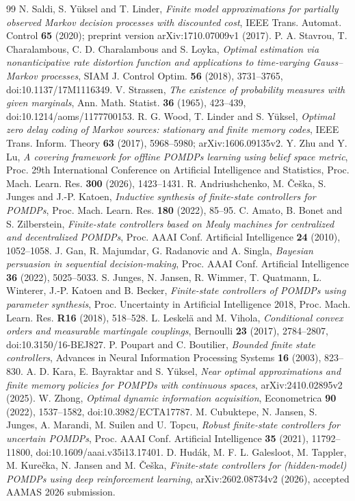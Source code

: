 \begin{thebibliography}{99}
 N. Saldi, S. Y\"uksel and T. Linder, \emph{Finite model approximations for partially observed Markov decision processes with discounted cost}, IEEE Trans. Automat. Control \textbf{65} (2020); preprint version arXiv:1710.07009v1 (2017).
 P. A. Stavrou, T. Charalambous, C. D. Charalambous and S. Loyka, \emph{Optimal estimation via nonanticipative rate distortion function and applications to time-varying Gauss--Markov processes}, SIAM J. Control Optim. \textbf{56} (2018), 3731--3765, doi:10.1137/17M1116349.
 V. Strassen, \emph{The existence of probability measures with given marginals}, Ann. Math. Statist. \textbf{36} (1965), 423--439, doi:10.1214/aoms/1177700153.
 R. G. Wood, T. Linder and S. Y\"uksel, \emph{Optimal zero delay coding of Markov sources: stationary and finite memory codes}, IEEE Trans. Inform. Theory \textbf{63} (2017), 5968--5980; arXiv:1606.09135v2.
 Y. Zhu and Y. Lu, \emph{A covering framework for offline POMDPs learning using belief space metric}, Proc. 29th International Conference on Artificial Intelligence and Statistics, Proc. Mach. Learn. Res. \textbf{300} (2026), 1423--1431.
 R. Andriushchenko, M. \v{C}e\v{s}ka, S. Junges and J.-P. Katoen, \emph{Inductive synthesis of finite-state controllers for POMDPs}, Proc. Mach. Learn. Res. \textbf{180} (2022), 85--95.
 C. Amato, B. Bonet and S. Zilberstein, \emph{Finite-state controllers based on Mealy machines for centralized and decentralized POMDPs}, Proc. AAAI Conf. Artificial Intelligence \textbf{24} (2010), 1052--1058.
 J. Gan, R. Majumdar, G. Radanovic and A. Singla, \emph{Bayesian persuasion in sequential decision-making}, Proc. AAAI Conf. Artificial Intelligence \textbf{36} (2022), 5025--5033.
 S. Junges, N. Jansen, R. Wimmer, T. Quatmann, L. Winterer, J.-P. Katoen and B. Becker, \emph{Finite-state controllers of POMDPs using parameter synthesis}, Proc. Uncertainty in Artificial Intelligence 2018, Proc. Mach. Learn. Res. \textbf{R16} (2018), 518--528.
 L. Leskel\"a and M. Vihola, \emph{Conditional convex orders and measurable martingale couplings}, Bernoulli \textbf{23} (2017), 2784--2807, doi:10.3150/16-BEJ827.
 P. Poupart and C. Boutilier, \emph{Bounded finite state controllers}, Advances in Neural Information Processing Systems \textbf{16} (2003), 823--830.
 A. D. Kara, E. Bayraktar and S. Y\"uksel, \emph{Near optimal approximations and finite memory policies for POMPDs with continuous spaces}, arXiv:2410.02895v2 (2025).
 W. Zhong, \emph{Optimal dynamic information acquisition}, Econometrica \textbf{90} (2022), 1537--1582, doi:10.3982/ECTA17787.
 M. Cubuktepe, N. Jansen, S. Junges, A. Marandi, M. Suilen and U. Topcu, \emph{Robust finite-state controllers for uncertain POMDPs}, Proc. AAAI Conf. Artificial Intelligence \textbf{35} (2021), 11792--11800, doi:10.1609/aaai.v35i13.17401.
 D. Hud\'ak, M. F. L. Galesloot, M. Tappler, M. Kure\v{c}ka, N. Jansen and M. \v{C}e\v{s}ka, \emph{Finite-state controllers for (hidden-model) POMDPs using deep reinforcement learning}, arXiv:2602.08734v2 (2026), accepted AAMAS 2026 submission.
\end{thebibliography}
